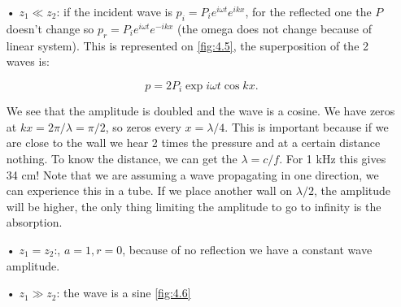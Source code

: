 	\begin{itemize}
	\item[•] $z_1 \ll z_2$: if the incident wave is $p_i = P_i e^{i\omega t} e^{ikx}$, for the reflected one the $P$ doesn't change so $p_r = P_i e^{i\omega t} e^{-ikx}$ (the omega does not change because of linear system). This is represented on \autoref{fig:4.5}, the superposition of the 2 waves is: 
	
	\begin{equation}
	p = 2P_i \exp i\omega t \cos kx.
	\end{equation} 
	
	We see that the amplitude is doubled and the wave is a cosine. We have zeros at $kx = 2\pi/\lambda = \pi / 2$, so zeros every $x = \lambda /4$. This is important because if we are close to the wall we hear 2 times the pressure and at a certain distance nothing. To know the distance, we can get the $\lambda = c/f$. For 1 kHz this gives 34 cm! Note that we are assuming a wave propagating in one direction, we can experience this in a tube. If we place another wall on $\lambda /2$, the amplitude will be higher, the only thing limiting the amplitude to go to infinity is the absorption. \\
	
	\item[•] $z_1 = z_2$:, $a= 1, r=0$, because of no reflection we have a constant wave amplitude. \\
	
	\item[•] $z_1 \gg z_2$: the wave is a sine \autoref{fig:4.6}
	\end{itemize}
	
